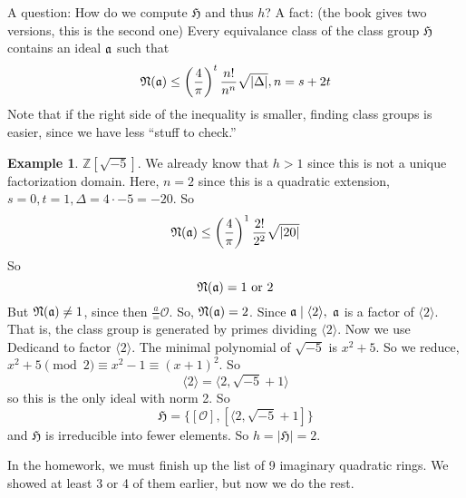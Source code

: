 \documentclass{article}
\theoremstyle{plain}
\theoremstyle{definition}
\newtheorem{exmp}[thm]{Example} %
\begin{document}
A question: How do we compute $\mathfrak{H}$ and thus $h$? A fact: (the book
gives two versions, this is the second one) Every equivalance class of the class
group $\mathfrak{H}$ contains an ideal $\frak{a}$ such that 
\[ \frak{N}(\frak{a}) \leq \left( \frac{4}{\pi}\right)^t \frac{n!}{n^n}
\sqrt{|\Delta|}, n = s + 2t \]
Note that if the right side of the inequality is smaller, finding class groups
is easier, since we have less ``stuff to check.'' 

\begin{exmp}$\mathbb{Z}[\sqrt{-5}]$. We already know that $h > 1$ since this is
not a unique factorization domain. Here, $n = 2$ since this is a quadratic
extension, $s = 0, t = 1, \Delta = 4 \cdot -5 = -20$. So 
\[ \frak{N}(\frak{a}) \leq \left( \frac{4}{\pi}\right)^1 \frac{2!}{2^2}
\sqrt{|20|} \]
So 
\[ \frak{N}(\frak{a}) = 1 \text{ or } 2 \]
But $\frak{N}(\frak{a}) \neq 1$, since then $\frac{a} = \mathcal{O}$. So, 
$\frak{N}(\frak{a}) = 2$. Since $\frak{a}\mid \langle 2 \rangle,$ $\frak{a}$ is
a factor of $\langle 2 \rangle$. That is, the class group is generated by primes
dividing $\langle 2 \rangle$. Now we use Dedicand to factor $\langle 2 \rangle$.
The minimal polynomial of $\sqrt{-5}$ is $x^2 + 5$. So we reduce, $x^2 + 5
\pmod{2} \equiv x^2 - 1  \equiv (x+1)^2$. So
\[ \langle 2 \rangle = \langle 2, \sqrt{-5}+1 \rangle \]
so this is the only ideal with norm 2. So
\[ \mathfrak{H} = \{[\mathcal{O}], [\langle2, \sqrt{-5}+1]\} \]
and $\mathfrak{H}$ is irreducible into fewer elements. So $h = |\mathfrak{H}| = 2$. 
\end{exmp}

In the homework, we must finish up the list of 9 imaginary quadratic rings. We
showed at least 3 or 4 of them earlier, but now we do the rest. 
\end{document}
